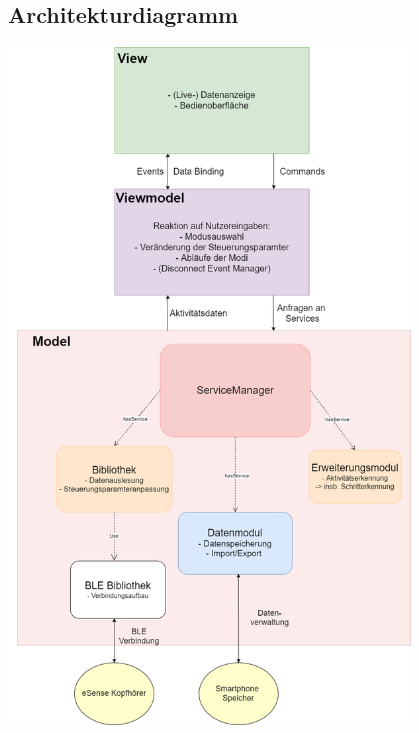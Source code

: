 \documentclass[a4paper,12pt]{article}
\begin{document}
	\subsection{Architekturdiagramm}
	\begin{center}
		\includegraphics[width=0.8\textwidth]{./Diagramme/ArchitekturdiagrammmitServiceManager.png}
	\end{center}
	\clearpage %
\end{document}
